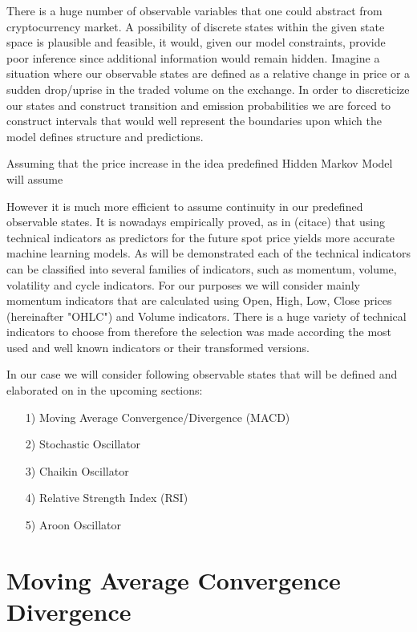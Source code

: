 	There is a huge number of observable variables that one could abstract from cryptocurrency market. A possibility of discrete states within the given state space is plausible and feasible, it would, given our model constraints, provide poor inference since additional information would remain hidden. Imagine a situation where our observable states are defined as a relative change in price or a sudden drop/uprise in the traded volume on the exchange. In order to discreticize our states and construct transition and emission probabilities we are forced to construct intervals that would well represent the boundaries upon which the model defines structure and predictions. 
	
Assuming that the price increase in   the idea predefined Hidden Markov Model will assume
	
	However it is much more efficient to assume continuity in our predefined observable states. It is nowadays empirically proved, as in (citace) that using technical indicators as predictors for the future spot price yields more accurate machine learning models. As will be demonstrated each of the technical indicators can be classified into several families of indicators, such as momentum, volume, volatility and cycle indicators. For our purposes we will consider mainly momentum indicators that are calculated using Open, High, Low, Close prices (hereinafter "OHLC") and Volume indicators. There is a huge variety of technical indicators to choose from therefore the selection was made according the most used and well known indicators or their transformed versions. 

In our case we will consider following observable states that will be defined and elaborated on in the upcoming sections:

\begin{itemize}
\item[1)] Moving Average Convergence/Divergence (MACD)
\item[2)] Stochastic Oscillator
\item[3)] Chaikin Oscillator 
\item[4)] Relative Strength Index (RSI)
\item[5)] Aroon Oscillator 
\end{itemize}


\section{Moving Average Convergence Divergence}

